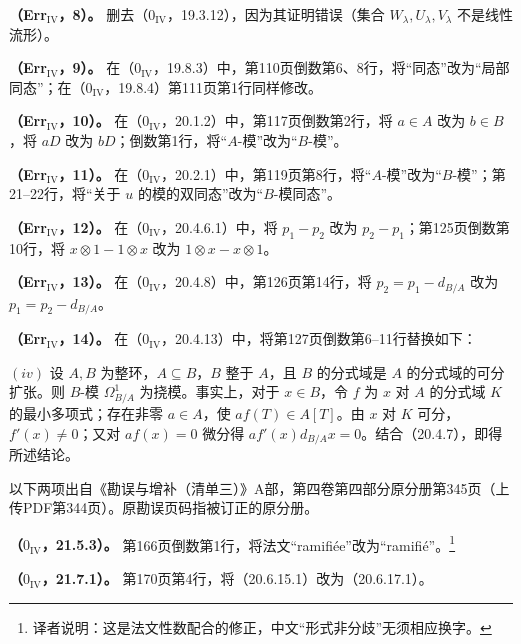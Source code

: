 \medskip
\hypertarget{ErrIV:8}{}
\noindent\textbf{（Err$_{\mathrm{IV}}$，8）。}
删去（$0_{\mathrm{IV}}$，19.3.12），因为其证明错误（集合 $W_\lambda,U_\lambda,V_\lambda$ 不是线性流形）。


\medskip
\hypertarget{ErrIV:9}{}
\noindent\textbf{（Err$_{\mathrm{IV}}$，9）。}
在（$0_{\mathrm{IV}}$，19.8.3）中，第110页倒数第6、8行，将“同态”改为“局部同态”；在（$0_{\mathrm{IV}}$，19.8.4）第111页第1行同样修改。


\medskip
\hypertarget{ErrIV:10}{}\noindent\textbf{（Err$_{\mathrm{IV}}$，10）。}
在（$0_{\mathrm{IV}}$，20.1.2）中，第117页倒数第2行，将 $a\in A$ 改为 $b\in B$，将 $aD$ 改为 $bD$；倒数第1行，将“$A$-模”改为“$B$-模”。

\medskip
\hypertarget{ErrIV:11}{}\noindent\textbf{（Err$_{\mathrm{IV}}$，11）。}
在（$0_{\mathrm{IV}}$，20.2.1）中，第119页第8行，将“$A$-模”改为“$B$-模”；第21--22行，将“关于 $u$ 的模的双同态”改为“$B$-模同态”。

\medskip
\hypertarget{ErrIV:12}{}\noindent\textbf{（Err$_{\mathrm{IV}}$，12）。}
在（$0_{\mathrm{IV}}$，20.4.6.1）中，将 $p_1-p_2$ 改为 $p_2-p_1$；第125页倒数第10行，将 $x\otimes1-1\otimes x$ 改为 $1\otimes x-x\otimes1$。

\medskip
\hypertarget{ErrIV:13}{}\noindent\textbf{（Err$_{\mathrm{IV}}$，13）。}
在（$0_{\mathrm{IV}}$，20.4.8）中，第126页第14行，将 $p_2=p_1-d_{B/A}$ 改为 $p_1=p_2-d_{B/A}$。

\medskip
\hypertarget{ErrIV:14}{}\noindent\textbf{（Err$_{\mathrm{IV}}$，14）。}
在（$0_{\mathrm{IV}}$，20.4.13）中，将第127页倒数第6--11行替换如下：

$(iv)$ 设 $A,B$ 为整环，$A\subseteq B$，$B$ 整于 $A$，且 $B$ 的分式域是 $A$ 的分式域的可分扩张。则 $B$-模 $\Omega^1_{B/A}$ 为挠模。事实上，对于 $x\in B$，令 $f$ 为 $x$ 对 $A$ 的分式域 $K$ 的最小多项式；存在非零 $a\in A$，使 $af(T)\in A[T]$。由 $x$ 对 $K$ 可分，$f'(x)\ne0$；又对 $af(x)=0$ 微分得 $af'(x)d_{B/A}x=0$。结合（20.4.7），即得所述结论。


\noindent 以下两项出自《勘误与增补（清单三）》A部，第四卷第四部分原分册第345页（上传PDF第344页）。原勘误页码指被订正的原分册。

\medskip
\noindent\textbf{（$0_{\mathrm{IV}}$，21.5.3）。}
第166页倒数第1行，将法文“ramifiée”改为“ramifié”。\footnote{译者说明：这是法文性数配合的修正，中文“形式非分歧”无须相应换字。}

\medskip
\noindent\textbf{（$0_{\mathrm{IV}}$，21.7.1）。}
第170页第4行，将（20.6.15.1）改为（20.6.17.1）。



